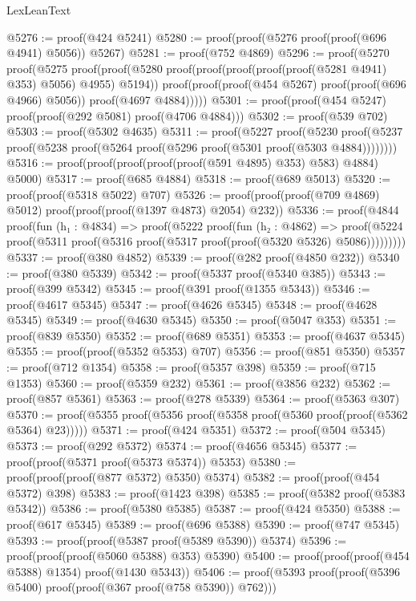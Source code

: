 \begin{lexlean}{LexLeanText}
\begin{coremodule}
@5276 := proof(@424 @5241)
@5280 := proof(proof(@5276 proof(proof(@696 @4941) @5056)) @5267)
@5281 := proof(@752 @4869)
@5296 := proof(@5270
      proof(@5275
          proof(proof(@5280 proof(proof(proof(proof(proof(@5281 @4941) @353) @5056) @4955) @5194))
              proof(proof(proof(@454 @5267) proof(proof(@696 @4966) @5056)) proof(@4697 @4884)))))
@5301 := proof(proof(@454 @5247) proof(proof(@292 @5081) proof(@4706 @4884)))
@5302 := proof(@539 @702)
@5303 := proof(@5302 @4635)
@5311 := proof(@5227
      proof(@5230
          proof(@5237 proof(@5238 proof(@5264 proof(@5296 proof(@5301 proof(@5303 @4884))))))))
@5316 := proof(proof(proof(proof(proof(@591 @4895) @353) @583) @4884) @5000)
@5317 := proof(@685 @4884)
@5318 := proof(@689 @5013)
@5320 := proof(proof(@5318 @5022) @707)
@5326 := proof(proof(proof(@709 @4869) @5012) proof(proof(proof(@1397 @4873) @2054) @232))
@5336 := proof(@4844
      proof(fun (h₁ : @4834) =>
        proof(@5222
            proof(fun (h₂ : @4862) =>
              proof(@5224
                  proof(@5311 proof(@5316 proof(@5317 proof(proof(@5320 @5326) @5086)))))))))
@5337 := proof(@380 @4852)
@5339 := proof(@282 proof(@4850 @232))
@5340 := proof(@380 @5339)
@5342 := proof(@5337 proof(@5340 @385))
@5343 := proof(@399 @5342)
@5345 := proof(@391 proof(@1355 @5343))
@5346 := proof(@4617 @5345)
@5347 := proof(@4626 @5345)
@5348 := proof(@4628 @5345)
@5349 := proof(@4630 @5345)
@5350 := proof(@5047 @353)
@5351 := proof(@839 @5350)
@5352 := proof(@689 @5351)
@5353 := proof(@4637 @5345)
@5355 := proof(proof(@5352 @5353) @707)
@5356 := proof(@851 @5350)
@5357 := proof(@712 @1354)
@5358 := proof(@5357 @398)
@5359 := proof(@715 @1353)
@5360 := proof(@5359 @232)
@5361 := proof(@3856 @232)
@5362 := proof(@857 @5361)
@5363 := proof(@278 @5339)
@5364 := proof(@5363 @307)
@5370 := proof(@5355 proof(@5356 proof(@5358 proof(@5360 proof(proof(@5362 @5364) @23)))))
@5371 := proof(@424 @5351)
@5372 := proof(@504 @5345)
@5373 := proof(@292 @5372)
@5374 := proof(@4656 @5345)
@5377 := proof(proof(@5371 proof(@5373 @5374)) @5353)
@5380 := proof(proof(proof(@877 @5372) @5350) @5374)
@5382 := proof(proof(@454 @5372) @398)
@5383 := proof(@1423 @398)
@5385 := proof(@5382 proof(@5383 @5342))
@5386 := proof(@5380 @5385)
@5387 := proof(@424 @5350)
@5388 := proof(@617 @5345)
@5389 := proof(@696 @5388)
@5390 := proof(@747 @5345)
@5393 := proof(proof(@5387 proof(@5389 @5390)) @5374)
@5396 := proof(proof(proof(@5060 @5388) @353) @5390)
@5400 := proof(proof(proof(@454 @5388) @1354) proof(@1430 @5343))
@5406 := proof(@5393 proof(proof(@5396 @5400) proof(proof(@367 proof(@758 @5390)) @762)))

\end{coremodule}
\end{lexlean}
